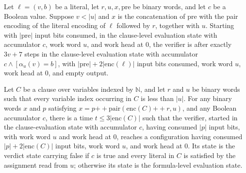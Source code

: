 \begin{lemma}
\label{Complexity.taut_literal_run}
\leanok
{}
Let $\ell=(v,b)$ be a literal, let $r,u,x,\mathrm{pre}$ be binary words, and let $c$ be
a Boolean value. Suppose $v<|u|$ and $x$ is the concatenation of $\mathrm{pre}$ with the
pair encoding of the literal encoding of $\ell$ followed by $r$, together with $u$.
Starting with $|\mathrm{pre}|$ input bits consumed, in the clause-level evaluation state
with accumulator $c$, work word $u$, and work head at $0$, the verifier is after exactly
$3v+7$ steps in the clause-level evaluation state with accumulator
$c\wedge[\alpha_u(v)=b]$, with $|\mathrm{pre}|+2|\mathrm{enc}(\ell)|$ input bits
consumed, work word $u$, work head at $0$, and empty output.
\end{lemma}

\begin{lemma}
\label{Complexity.taut_clause_run}
\leanok
{}
Let $C$ be a clause over variables indexed by $\mathbb{N}$, and let $r$ and $u$ be
binary words such that every variable index occurring in $C$ is less than $|u|$. For any
binary words $x$ and $p$ satisfying
$x=p\mathbin{++}\mathrm{pair}(\mathrm{enc}(C)\mathbin{++}r,u)$, and any Boolean
accumulator $c$, there is a time $t\le 3|\mathrm{enc}(C)|$ such that the verifier,
started in the clause-evaluation state with accumulator $c$, having consumed $|p|$ input
bits, with work word $u$ and work head at $0$, reaches a configuration having consumed
$|p|+2|\mathrm{enc}(C)|$ input bits, work word $u$, and work head at $0$. Its state is
the verdict state carrying false if $c$ is true and every literal in $C$ is satisfied by
the assignment read from $u$; otherwise its state is the formula-level evaluation state.
\end{lemma}

